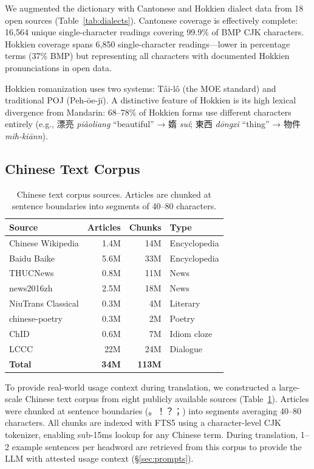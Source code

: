 \documentclass[11pt]{article}
\begin{document}
We augmented the dictionary with Cantonese and Hokkien dialect data from 18 open sources (Table~\ref{tab:dialects}). Cantonese coverage is effectively complete: 16,564 unique single-character readings covering 99.9\% of BMP CJK characters. Hokkien coverage spans 6,850 single-character readings---lower in percentage terms (37\% BMP) but representing all characters with documented Hokkien pronunciations in open data.

Hokkien romanization uses two systems: Tâi-lô (the MOE standard) and traditional POJ (Peh-ōe-jī). A distinctive feature of Hokkien is its high lexical divergence from Mandarin: 68--78\% of Hokkien forms use different characters entirely (e.g., 漂亮 \textit{piàoliang} ``beautiful'' → 媠 \textit{suí}; 東西 \textit{dōngxi} ``thing'' → 物件 \textit{mih-kiānn}).

\subsection{Chinese Text Corpus}

\begin{table}[t]
\centering
\small
\begin{tabular}{lrrl}
\toprule
\textbf{Source} & \textbf{Articles} & \textbf{Chunks} & \textbf{Type} \\
\midrule
Chinese Wikipedia & 1.4M & 14M & Encyclopedia \\
Baidu Baike        & 5.6M & 33M & Encyclopedia \\
THUCNews           & 0.8M & 11M & News \\
news2016zh         & 2.5M & 18M & News \\
NiuTrans Classical & 0.3M &  4M & Literary \\
chinese-poetry     & 0.3M &  2M & Poetry \\
ChID               & 0.6M &  7M & Idiom cloze \\
LCCC               & 22M  & 24M & Dialogue \\
\midrule
\textbf{Total}     & \textbf{34M} & \textbf{113M} & \\
\bottomrule
\end{tabular}
\caption{Chinese text corpus sources. Articles are chunked at sentence boundaries into segments of 40--80 characters.}
\label{tab:corpus}
\end{table}

To provide real-world usage context during translation, we constructed a large-scale Chinese text corpus from eight publicly available sources (Table~\ref{tab:corpus}). Articles were chunked at sentence boundaries (。！？；) into segments averaging 40--80 characters. All chunks are indexed with FTS5 using a character-level CJK tokenizer, enabling sub-15ms lookup for any Chinese term. During translation, 1--2 example sentences per headword are retrieved from this corpus to provide the LLM with attested usage context (\S\ref{sec:prompts}).
\end{document}
